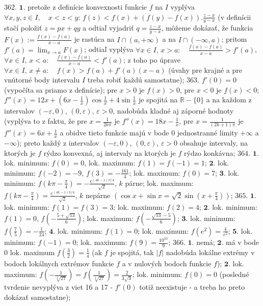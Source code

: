 $\boxed{362.}$ $\boldsymbol{1.}$ pretože z definície konvexnosti funkcie $f$  na $I$ vyplýva $\forall x,y,z\in I, \quad x<z<y: \, f(z) <f(x)+(f(y)-f(x)).\frac{z-x}{y-x}$ (v definícii stačí položiť  $z=px+qy$ a odtiaľ vyjadriť $q=\frac{z-x}{y-x}$, môžeme dokázať, že funkcia $F(x):=\frac{f(x)-f(a)}{x-a}$ je rastúca na $I\cap (a,+\infty)$ a na $I\cap (-\infty,a)$; pritom $f'(a)=\lim_{x \to a}F(x)$; odtiaľ vyplýva $\forall x\in I, \, x>a: \quad \frac{f(x)-f(a)}{x-a}>f'(a)$, $\forall x\in I, \, x<a: \quad \frac{f(x)-f(a)}{x-a}<f'(a)$; z toho po úprave  $\forall x\in I, \, x \ne a: \quad f(x)>f(a)+f'(a)(x-a)$ (úvahy pre krajné a pre vnútorné body intervalu $I$ treba robiť každú samostatne);
$\boxed{363.}$ $f'(0)=0$ (vypočíta sa priamo z definície); pre $x>0$ je  $f(x)>0$, pre  $x<0$  je $f(x)<0$; $f''(x)=12x+(6x-\frac{1}{x})\cos\frac{1}{x}+4\sin\frac{1}{x}$ je spojitá na $\mathbb{R}-\lbrace 0 \rbrace$ a  na každom z intervalov $(-\varepsilon ,0)$, $(0,\varepsilon)$, $\varepsilon>0$, nadobúda kladné aj záporné hodnoty (vyplýva to z faktu, že pre $x=\frac{1}{2k\pi}$ je $f''(x)=18x-\frac{1}{x}$, pre  $x=\frac{1}{(2k+1)\pi}$ je $f''(x)=6x+\frac{1}{x}$ a obidve tieto funkcie majú v bode $0$ jednostranné limity $+\infty$ a $-\infty$); preto každý z intervalov $(-\varepsilon ,0)$, $(0,\varepsilon)$, $\varepsilon>0$ obsahuje intervaly, na ktorých je $f$ rýdzo konvexná, aj intervaly na ktorých je  $f$ rýdzo konkávna;
$\boxed{364.}$ $\boldsymbol{1.}$ lok. minimum: $f(0)=0$, lok. maximum: $f(1)=f(-1)=1$;
$\boldsymbol{2.}$ lok. minimum: $f(-2)=-9$, $f(3)=-\frac{161}{4}$; lok. maximum: $f(0)=7$;
$\boldsymbol{3.}$ lok. minimum: $f(k\pi-\frac{\pi}{4})=-\frac{e^{(4k-1)\pi/4}}{\sqrt{2}}$, $k$ párne;  lok. maximum: $f(k\pi-\frac{\pi}{4})=\frac{e^{(4k-1)\pi/4}}{\sqrt{2}}$, $k$ nepárne $(\cos x+\sin x=\sqrt{2}\sin (x+\frac{\pi}{4}))$; 
$\boxed{365.}$ $\boldsymbol{1.}$ lok. minimum: $f(1)=f(3)=3$; lok. maximum: $f(2)=4$;
$\boldsymbol{2.}$ lok. minimum: $f(1)=0$, $f(-\frac{5+\sqrt{13}}{6})$; lok. maximum: $f(-\frac{\sqrt{13}-5}{6})$;
$\boldsymbol{3.}$ lok. minimum: $f(\frac{7}{5})=-\frac{1}{24}$; 
$\boldsymbol{4.}$ lok. minimum: $f(1)=0$; lok. maximum: $f(e^{2})=\frac{4}{e^{2}}$;
$\boldsymbol{5.}$ lok. minimum: $f(-1)=0$; lok. maximum: $f(9)=\frac{10^{10}}{9}$;
$\boxed{366.}$ $\boldsymbol{1.}$ nemá;
$\boldsymbol{2.}$ má v bode 0 lok. maximum $f(\frac{3}{2})=\frac{1}{4}$ (ak $f$ je spojitá, tak $\vert f \vert$ nadobúda lokálne extrémy v bodoch lokálnych extrémov funkcie $f$ a v nulových bodoch funkcie $f$);
$\boldsymbol{2.}$ lok. maximum: $f(-\frac{1}{\sqrt[4]{27}})=f(\frac{1}{\sqrt[4]{27}})=\frac{2}{3\sqrt{3}}$; lok. minimum: $f(0)=0$ (posledné tvrdenie nevyplýva z viet 16 a 17 - $f'(0)$ totiž neexistuje - a treba ho preto dokázať samostatne);
